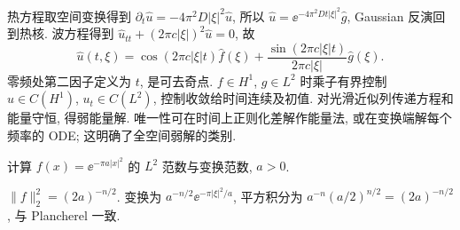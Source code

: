 热方程取空间变换得到 $\partial_t\widehat u=-4\pi^2D|\xi|^2\widehat u$, 所以 $\widehat u=\ee^{-4\pi^2Dt|\xi|^2}\widehat g$, Gaussian 反演回到热核. 波方程得到 $\widehat u_{tt}+(2\pi c|\xi|)^2\widehat u=0$, 故
\[
\widehat u(t,\xi)=\cos(2\pi c|\xi|t)\widehat f(\xi)
+\frac{\sin(2\pi c|\xi|t)}{2\pi c|\xi|}\widehat g(\xi).
\]
零频处第二因子定义为 $t$, 是可去奇点. $f\in H^1$, $g\in L^2$ 时乘子有界控制 $u\in C(H^1)$, $u_t\in C(L^2)$, 控制收敛给时间连续及初值. 对光滑近似列传递方程和能量守恒, 得弱能量解. 唯一性可在时间上正则化差解作能量法, 或在变换端解每个频率的 ODE; 这明确了全空间弱解的类别.
\begin{exercise}
计算 $f(x)=\ee^{-\pi a|x|^2}$ 的 $L^2$ 范数与变换范数, $a>0$.
\end{exercise}
\begin{solution}
$\|f\|_2^2=(2a)^{-n/2}$. 变换为 $a^{-n/2}\ee^{-\pi|\xi|^2/a}$, 平方积分为 $a^{-n}(a/2)^{n/2}=(2a)^{-n/2}$, 与 Plancherel 一致.
\end{solution}

